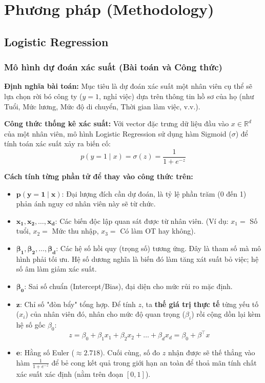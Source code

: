 \chapter{Phương pháp (Methodology)}

\section{Logistic Regression}
\subsection{Mô hình dự đoán xác suất (Bài toán và Công thức)}

\textbf{Định nghĩa bài toán:} Mục tiêu là dự đoán xác suất một nhân viên cụ thể sẽ lựa chọn rời bó công ty (\(y = 1\), nghỉ việc) dựa trên thông tin hồ sơ của họ (như Tuổi, Mức lương, Mức độ di chuyển, Thời gian làm việc, v.v.).

\textbf{Công thức thống kê xác suất:} Với vector đặc trưng dữ liệu đầu vào \(x \in \mathbb{R}^d\) của một nhân viên, mô hình Logistic Regression sử dụng hàm Sigmoid (\(\sigma\)) để tính toán xác suất xảy ra biến cố:
\[
p(y=1\mid x) = \sigma(z) = \frac{1}{1+e^{-z}}
\]

\textbf{Cách tính từng phần tử để thay vào công thức trên:}
\begin{itemize}
    \item \(\mathbf{p(y=1\mid x)}\): Đại lượng đích cần dự đoán, là tỷ lệ phần trăm (0 đến 1) phản ánh nguy cơ nhân viên này sẽ từ chức.
    \item \(\mathbf{x_1, x_2, \dots, x_d}\): Các biến độc lập quan sát được từ nhân viên. (Ví dụ: \(x_1 =\) Số tuổi, \(x_2 =\) Mức thu nhập, \(x_3 =\) Có làm OT hay không).
    \item \(\mathbf{\beta_1, \beta_2, \dots, \beta_d}\): Các hệ số hồi quy (trọng số) tương ứng. Đây là tham số mà mô hình phải tối ưu. Hệ số dương nghĩa là biến đó làm tăng xát suất bỏ việc; hệ số âm làm giảm xác suất.
    \item \(\mathbf{\beta_0}\): Sai số chuẩn (Intercept/Bias), đại diện cho mức rủi ro mặc định.
    \item \(\mathbf{z}\): Chỉ số "đòn bẩy" tổng hợp. Để tính \(z\), ta \textbf{thế giá trị thực tế} từng yếu tố (\(x_i\)) của nhân viên đó, nhân cho mức độ quan trọng (\(\beta_i\)) rồi cộng dồn lại kèm hệ số gốc \(\beta_0\):
    \[
    z = \beta_0 + \beta_1 x_1 + \beta_2 x_2 + \dots + \beta_d x_d = \beta_0 + \beta^\top x
    \]
    \item \(\mathbf{e}\): Hằng số Euler (\(\approx 2.718\)). Cuối cùng, số đo \(z\) nhận được sẽ thế thẳng vào hàm \(\frac{1}{1 + e^{-z}}\) để bẻ cong kết quả trong giới hạn an toàn để thoả mãn tính chất xác suất xác định (nằm trên đoạn \([0, 1]\)).
\end{itemize}

